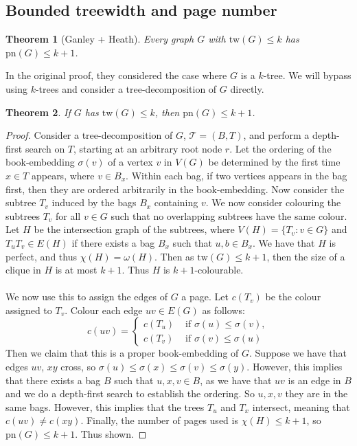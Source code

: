 \documentclass[]{report}
\newcommand{\tree}{\mathcal{T}}
\newcommand{\tw}{\text{tw}}
\newcommand{\pn}{\text{pn}}
\newtheorem{theorem}{Theorem}
\theoremstyle{definition}
\numberwithin{theorem}{section}
\numberwithin{equation}{section}
\begin{document}
\subsection{Bounded treewidth and page number}\label{ssec:Bounded_Treewidth}
\begin{theorem}[Ganley + Heath\cite{ganleyPagenumberTrees2001}]\label{thm:bded_treewidth_bded_pagenumber}
	Every graph $G$ with $\tw(G) \leq k$ has $\pn(G) \leq k + 1$. 
\end{theorem}
In the original proof, they considered the case where $G$ is a $k$-tree. We will bypass using $k$-trees and consider a tree-decomposition of $G$ directly. 

\begin{theorem}
	If $G$ has $\tw(G) \leq k$, then $\pn(G) \leq k + 1$. 
\end{theorem}
\begin{proof}
	Consider a tree-decomposition of $G$, $\tree = (B, T)$, and perform a depth-first search on $T$, starting at an arbitrary root node $r$. Let the ordering of the book-embedding $\sigma(v)$ of a vertex $v$ in $V(G)$ be determined by the first time $x \in T$ appears, where $v \in B_x$. Within each bag, if two vertices appears in the bag first, then they are ordered arbitrarily in the book-embedding. Now consider the subtree $T_v$ induced by the bags $B_x$ containing $v$. We now consider colouring the subtrees $T_v$ for all $v \in G$ such that no overlapping subtrees have the same colour. Let $H$ be the intersection graph of the subtrees, where $V(H) = \lbrace T_v : v \in G \rbrace$ and $T_u T_v \in E(H)$ if there exists a bag $B_x$ such that $u, b \in B_x$. We have that $H$ is perfect, and thus $\chi(H) = \omega(H)$. Then as $\tw(G) \leq k + 1$, then the size of a clique in $H$ is at most $k + 1$. Thus $H$ is $k + 1$-colourable.
	\paragraph{}
	We now use this to assign the edges of $G$ a page. Let $c(T_v)$ be the colour assigned to $T_v$. Colour each edge $uv \in E(G)$ as follows:
	\begin{equation}
		c(uv) = 
		\begin{cases}
			c(T_u) &\text{ if } \sigma(u) \leq \sigma(v),\\
			c(T_v) &\text{ if } \sigma(v) \leq \sigma(u)
		\end{cases}
	\end{equation}
	Then we claim that this is a proper book-embedding of $G$. Suppose we have that edges $uv$, $xy$ cross, so $\sigma(u) \leq \sigma(x) \leq \sigma(v) \leq \sigma(y)$. However, this implies that there exists a bag $B$ such that $u, x, v \in B$, as we have that $uv$ is an edge in $B$ and we do a depth-first search to establish the ordering. So $u, x, v$ they are in the same bags. However, this implies that the trees $T_u$ and $T_x$ intersect, meaning that $c(uv) \neq c(xy)$. Finally, the number of pages used is $\chi(H) \leq k + 1$, so $\pn(G) \leq k + 1$. Thus shown.
\end{proof}
\end{document}
